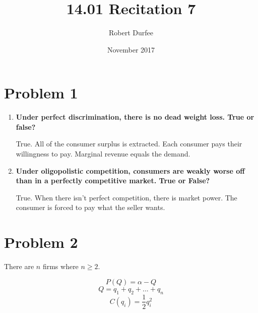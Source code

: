 \documentclass{article}
\title{14.01 Recitation 7}
\author{Robert Durfee}
\date{November 2017}
\begin{document}
\maketitle

\section*{Problem 1}

\begin{enumerate}
    \item \textbf{Under perfect discrimination, there is no dead weight loss. True or false?}
    
    True. All of the consumer surplus is extracted. Each consumer pays their willingness to pay. Marginal revenue equals the demand.
    
    \item \textbf{Under oligopolistic competition, consumers are weakly worse off than in a perfectly competitive market. True or False?}
    
    True. When there isn't perfect competition, there is market power. The consumer is forced to pay what the seller wants.
    
\end{enumerate}

\section*{Problem 2}

There are $n$ firms where $n \geq 2$. 

$$P(Q)=\alpha-Q$$
$$Q=q_{1}+q_{2}+...+q_{n}$$
$$C(q_{i})=\frac{1}{2}q_{i}^{2}$$
\end{document}
